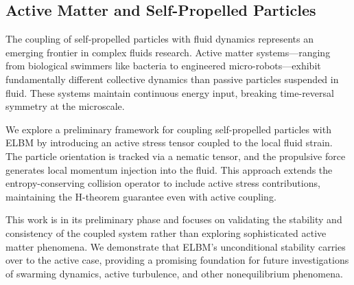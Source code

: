 \subsection{Active Matter and Self-Propelled Particles}

The coupling of self-propelled particles with fluid dynamics represents an emerging frontier in complex fluids research. Active matter systems—ranging from biological swimmers like bacteria to engineered micro-robots—exhibit fundamentally different collective dynamics than passive particles suspended in fluid. These systems maintain continuous energy input, breaking time-reversal symmetry at the microscale.

We explore a preliminary framework for coupling self-propelled particles with ELBM by introducing an active stress tensor coupled to the local fluid strain. The particle orientation is tracked via a nematic tensor, and the propulsive force generates local momentum injection into the fluid. This approach extends the entropy-conserving collision operator to include active stress contributions, maintaining the H-theorem guarantee even with active coupling.

This work is in its preliminary phase and focuses on validating the stability and consistency of the coupled system rather than exploring sophisticated active matter phenomena. We demonstrate that ELBM's unconditional stability carries over to the active case, providing a promising foundation for future investigations of swarming dynamics, active turbulence, and other nonequilibrium phenomena.
